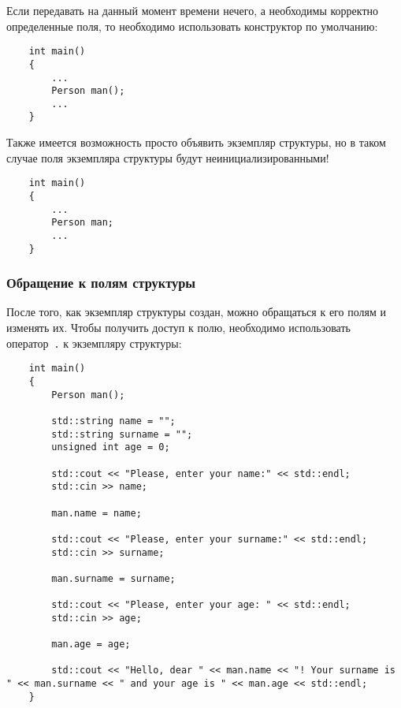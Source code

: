 Если передавать на данный момент времени нечего, а необходимы корректно определенные поля, то необходимо использовать конструктор по умолчанию:
\begin{lstlisting}
    int main()
    {
        ...
        Person man();
        ...
    }
\end{lstlisting} 

Также имеется возможность просто объявить экземпляр структуры, но в таком случае поля экземпляра структуры будут неинициализированными!

\begin{lstlisting}
    int main()
    {
        ...
        Person man;
        ...
    }
\end{lstlisting}

\subsubsection{Обращение к полям структуры}

После того, как экземпляр структуры создан, можно обращаться к его полям и изменять их. Чтобы получить доступ к полю, необходимо использовать оператор~\lstinline|.| к экземпляру структуры:

\begin{lstlisting}
    int main()
    {
        Person man();
        
        std::string name = "";
        std::string surname = "";
        unsigned int age = 0;
        
        std::cout << "Please, enter your name:" << std::endl;
        std::cin >> name;
        
        man.name = name;
        
        std::cout << "Please, enter your surname:" << std::endl;
        std::cin >> surname;
        
        man.surname = surname;
        
        std::cout << "Please, enter your age: " << std::endl;
        std::cin >> age;
        
        man.age = age;
        
        std::cout << "Hello, dear " << man.name << "! Your surname is " << man.surname << " and your age is " << man.age << std::endl;
    }
\end{lstlisting}